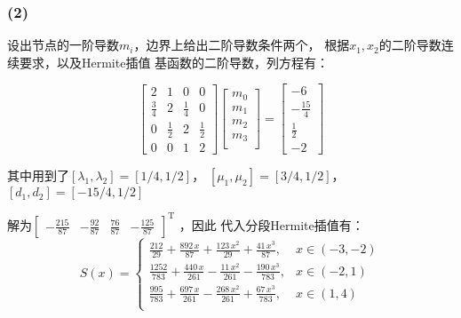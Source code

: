 \documentclass[UTF8,zihao=5]{ctexart}
\newcommand{\trans}[0]{^\mathrm{T}}
\begin{document}
\subsubsection*{(2)}
设出节点的一阶导数$m_i$，边界上给出二阶导数条件两个，
根据$x_1,x_2$的二阶导数连续要求，以及Hermite插值
基函数的二阶导数，列方程有：

$$
    \left[\begin{array}{cccc} 2 & 1 & 0 & 0\\ \frac{3}{4} & 2 & \frac{1}{4} & 0\\ 0 & \frac{1}{2} & 2 & \frac{1}{2}\\ 0 & 0 & 1 & 2 \end{array}\right]
    \begin{bmatrix}
        m_0 \\
        m_1 \\
        m_2 \\
        m_3 \\
    \end{bmatrix}
    =\left[\begin{array}{c} -6\\ -\frac{15}{4}\\ \frac{1}{2}\\ -2 \end{array}\right]
$$

其中用到了$[\lambda_1,\lambda_2]=[1/4,1/2]$，
$[\mu_1,\mu_2]=[3/4,1/2]$，
$[d_1,d_2]=[-15/4,1/2]$

解为$\left[\begin{array}{cccc} -\frac{215}{87} & -\frac{92}{87} & \frac{76}{87} & -\frac{125}{87} \end{array}\right]\trans  $
，因此
代入分段Hermite插值有：
$$
    S(x)=\left\{
    \begin{array}{lr}
        \frac{212}{29}+\frac{892\,x}{87}+\frac{123\,x^2}{29}+\frac{41\,x^3}{87},      & x\in(-3,-2) \\
        \frac{1252}{783}+\frac{440\,x}{261}-\frac{11\,x^2}{261}-\frac{190\,x^3}{783}, & x\in(-2,1)  \\
        \frac{995}{783}+\frac{697\,x}{261}-\frac{268\,x^2}{261}+\frac{67\,x^3}{783},  & x\in(1,4)   \\
    \end{array}
    \right.
$$
\end{document}
